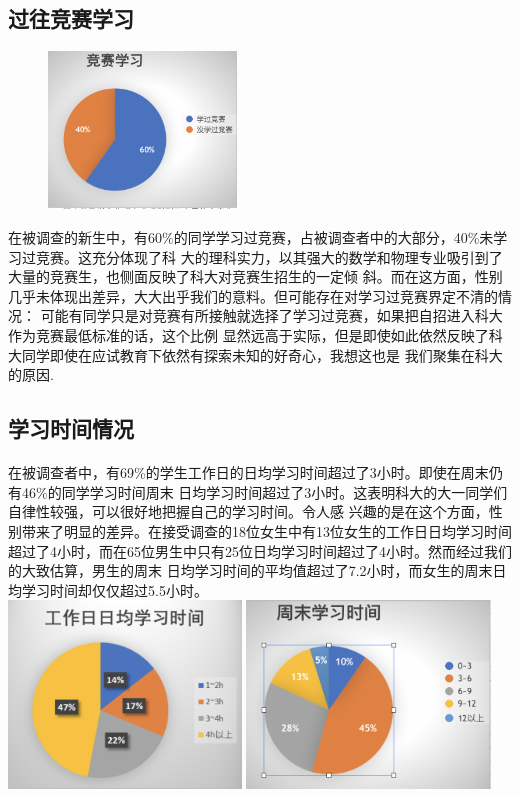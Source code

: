 \documentclass[UTF8]{ctexart}
\begin{document}
\subsection{过往竞赛学习}
\begin{figure}
\includegraphics[width=5cm]{chart/竞赛学习.png}
\end{figure}
在被调查的新生中，有60\%的同学学习过竞赛，占被调查者中的大部分，40\%未学习过竞赛。这充分体现了科
大的理科实力，以其强大的数学和物理专业吸引到了大量的竞赛生，也侧面反映了科大对竞赛生招生的一定倾
斜。而在这方面，性别几乎未体现出差异，大大出乎我们的意料。但可能存在对学习过竞赛界定不清的情况：
可能有同学只是对竞赛有所接触就选择了学习过竞赛，如果把自招进入科大作为竞赛最低标准的话，这个比例
显然远高于实际，但是即使如此依然反映了科大同学即使在应试教育下依然有探索未知的好奇心，我想这也是
我们聚集在科大的原因.

\subsection{学习时间情况}
\paragraph{}
在被调查者中，有69\%的学生工作日的日均学习时间超过了3小时。即使在周末仍有46\%的同学学习时间周末
日均学习时间超过了3小时。这表明科大的大一同学们自律性较强，可以很好地把握自己的学习时间。令人感
兴趣的是在这个方面，性别带来了明显的差异。在接受调查的18位女生中有13位女生的工作日日均学习时间
超过了4小时，而在65位男生中只有25位日均学习时间超过了4小时。然而经过我们的大致估算，男生的周末
日均学习时间的平均值超过了7.2小时，而女生的周末日均学习时间却仅仅超过5.5小时。\\
\includegraphics[height=5cm]{chart/工作日日均.png}
\includegraphics[height=5cm]{chart/周末.png}
\end{document}

